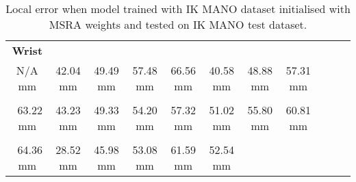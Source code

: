     \begin{table}[!ht]
    \begin{tabular}{|c|c|c|c|c|c|c|c|c|c|c|}
    \hline
    {\bfseries Wrist} & \cellcolor[HTML]{ffff00}{\bfseries IMCP} & \cellcolor[HTML]{ffff00}{\bfseries IPIP} & \cellcolor[HTML]{ffbf00}{\bfseries IDIP} & \cellcolor[HTML]{ff8000}{\bfseries ITIP} & \cellcolor[HTML]{ffff00}{\bfseries MMCP} & \cellcolor[HTML]{ffff00}{\bfseries MPIP} & \cellcolor[HTML]{ffbf00}{\bfseries MDIP}  \\
    N/A mm & \cellcolor[HTML]{ffff00}$\,\,\,$42.04 mm & \cellcolor[HTML]{ffff00}$\,\,\,$49.49 mm & \cellcolor[HTML]{ffbf00}$\,\,\,$57.48 mm & \cellcolor[HTML]{ff8000}$\,\,\,$66.56 mm & \cellcolor[HTML]{ffff00}$\,\,\,$40.58 mm & \cellcolor[HTML]{ffff00}$\,\,\,$48.88 mm & \cellcolor[HTML]{ffbf00}$\,\,\,$57.31 mm\\
    \hline
    \cellcolor[HTML]{ff8000}{\bfseries MTIP} & \cellcolor[HTML]{ffff00}{\bfseries RMCP} & \cellcolor[HTML]{ffff00}{\bfseries RPIP} & \cellcolor[HTML]{ffbf00}{\bfseries RDIP} & \cellcolor[HTML]{ffbf00}{\bfseries RTIP} & \cellcolor[HTML]{ffbf00}{\bfseries PMCP} & \cellcolor[HTML]{ffbf00}{\bfseries PPIP} & \cellcolor[HTML]{ff8000}{\bfseries PDIP}  \\
    \cellcolor[HTML]{ff8000}$\,\,\,$63.22 mm & \cellcolor[HTML]{ffff00}$\,\,\,$43.23 mm & \cellcolor[HTML]{ffff00}$\,\,\,$49.33 mm & \cellcolor[HTML]{ffbf00}$\,\,\,$54.20 mm & \cellcolor[HTML]{ffbf00}$\,\,\,$57.32 mm & \cellcolor[HTML]{ffbf00}$\,\,\,$51.02 mm & \cellcolor[HTML]{ffbf00}$\,\,\,$55.80 mm & \cellcolor[HTML]{ff8000}$\,\,\,$60.81 mm\\
    \hline
    \cellcolor[HTML]{ff8000}{\bfseries PTIP} & \cellcolor[HTML]{80ff00}{\bfseries TMCP} & \cellcolor[HTML]{ffff00}{\bfseries TPIP} & \cellcolor[HTML]{ffbf00}{\bfseries PDIP} & \cellcolor[HTML]{ff8000}{\bfseries TTIP} & \cellcolor[HTML]{ffbf00}{\bfseries Average}  \\
    \cellcolor[HTML]{ff8000}$\,\,\,$64.36 mm & \cellcolor[HTML]{80ff00}$\,\,\,$28.52 mm & \cellcolor[HTML]{ffff00}$\,\,\,$45.98 mm & \cellcolor[HTML]{ffbf00}$\,\,\,$53.08 mm & \cellcolor[HTML]{ff8000}$\,\,\,$61.59 mm & \cellcolor[HTML]{ffbf00}$\,\,\,$52.54 mm \\
    \cline{1-6}
    \end{tabular}
    \caption{Local error when model trained with IK MANO dataset initialised with MSRA weights and tested on IK MANO test dataset.}
    \label{tb:amol}
    \end{table}